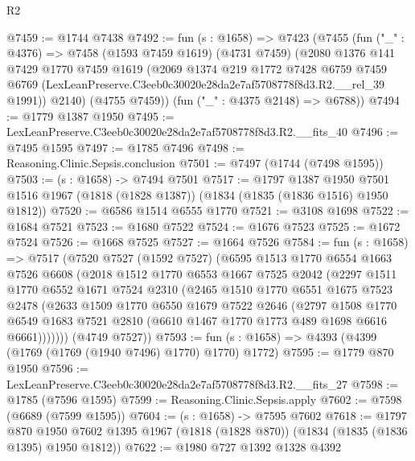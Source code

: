 \begin{lexlean}{R2}
\begin{coremodule}
@7459 := @1744 @7438
@7492 := fun (s : @1658) =>
  @7423
    (@7455
      (fun ("_" : @4376) =>
      @7458
        (@1593 @7459 @1619)
        (@4731 @7459)
        (@2080
          @1376
          @141
          @7429
          @1770
          @7459
          @1619
          (@2069
            @1374
            @219
            @1772
            @7428
            @6759
            @7459
            @6769
            (LexLeanPreserve.C3eeb0c30020e28da2e7af5708778f8d3.R2.__rel_39 @1991))
          @2140)
        (@4755 @7459))
      (fun ("_" : @4375 @2148) => @6788))
@7494 := @1779 @1387 @1950
@7495 := LexLeanPreserve.C3eeb0c30020e28da2e7af5708778f8d3.R2.__fits_40
@7496 := @7495 @1595
@7497 := @1785 @7496
@7498 := Reasoning.Clinic.Sepsis.conclusion
@7501 := @7497 (@1744 (@7498 @1595))
@7503 := (s : @1658) -> @7494 @7501
@7517 := @1797
    @1387
    @1950
    @7501
    @1516
    @1967
    (@1818 (@1828 @1387))
    (@1834 (@1835 (@1836 @1516) @1950 @1812))
@7520 := @6586 @1514 @6555 @1770
@7521 := @3108 @1698
@7522 := @1684 @7521
@7523 := @1680 @7522
@7524 := @1676 @7523
@7525 := @1672 @7524
@7526 := @1668 @7525
@7527 := @1664 @7526
@7584 := fun (s : @1658) =>
  @7517
    (@7520
      @7527
      (@1592 @7527)
      (@6595
        @1513
        @1770
        @6554
        @1663
        @7526
        @6608
        (@2018
          @1512
          @1770
          @6553
          @1667
          @7525
          @2042
          (@2297
            @1511
            @1770
            @6552
            @1671
            @7524
            @2310
            (@2465
              @1510
              @1770
              @6551
              @1675
              @7523
              @2478
              (@2633
                @1509
                @1770
                @6550
                @1679
                @7522
                @2646
                (@2797
                  @1508
                  @1770
                  @6549
                  @1683
                  @7521
                  @2810
                  (@6610 @1467 @1770 @1773 @489 @1698 @6616 @6661)))))))
      (@4749 @7527))
@7593 := fun (s : @1658) => @4393 (@4399 (@1769 (@1769 (@1940 @7496) @1770) @1770) @1772)
@7595 := @1779 @870 @1950
@7596 := LexLeanPreserve.C3eeb0c30020e28da2e7af5708778f8d3.R2.__fits_27
@7598 := @1785 (@7596 @1595)
@7599 := Reasoning.Clinic.Sepsis.apply
@7602 := @7598 (@6689 (@7599 @1595))
@7604 := (s : @1658) -> @7595 @7602
@7618 := @1797
    @870
    @1950
    @7602
    @1395
    @1967
    (@1818 (@1828 @870))
    (@1834 (@1835 (@1836 @1395) @1950 @1812))
@7622 := @1980 @727 @1392 @1328 @4392

\end{coremodule}
\end{lexlean}
